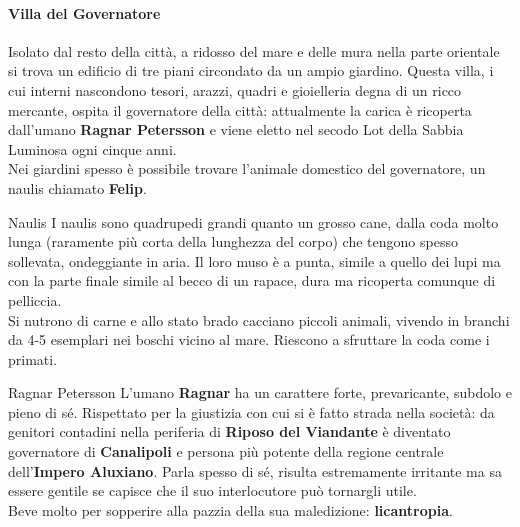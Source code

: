 \documentclass[10pt,twoside,onecolumn,openany]{book}
\begin{document}
\paragraph{Villa del Governatore}
Isolato dal resto della città, a ridosso del mare e delle mura nella parte orientale si trova un edificio di tre piani circondato da un ampio giardino. Questa villa, i cui interni nascondono tesori, arazzi, quadri e gioielleria degna di un ricco mercante, ospita il governatore della città: attualmente la carica è ricoperta dall'umano \textbf{Ragnar Petersson} e viene eletto nel secodo Lot della Sabbia Luminosa ogni cinque anni.\\
Nei giardini spesso è possibile trovare l'animale domestico del governatore, un naulis chiamato \textbf{Felip}.
\begin{multicols}{2}
\begin{commentbox}{{Naulis}}
I naulis sono quadrupedi grandi quanto un grosso cane, dalla coda molto lunga (raramente più corta della lunghezza del corpo) che tengono spesso sollevata, ondeggiante in aria. Il loro muso è a punta, simile a quello dei lupi ma con la parte finale simile al becco di un rapace, dura ma ricoperta comunque di pelliccia.\\
Si nutrono di carne e allo stato brado cacciano piccoli animali, vivendo in branchi da 4-5 esemplari nei boschi vicino al mare. Riescono a sfruttare la coda come i primati.
\end{commentbox}
\columnbreak
\begin{paperbox}{{Ragnar Petersson}}
L'umano \textbf{Ragnar} ha un carattere forte, prevaricante, subdolo e pieno di sé. Rispettato per la giustizia con cui si è fatto strada nella società: da genitori contadini nella periferia di \textbf{Riposo del Viandante} è diventato governatore di \textbf{Canalipoli} e persona più potente della regione centrale dell'\textbf{Impero Aluxiano}. Parla spesso di sé, risulta estremamente irritante ma sa essere gentile se capisce che il suo interlocutore può tornargli utile.\\
Beve molto per sopperire alla pazzia della sua maledizione: \textbf{licantropia}.
\end{paperbox}
\end{multicols}
\end{document}
